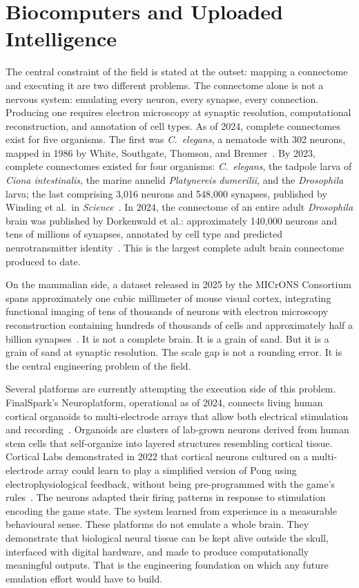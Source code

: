 \documentclass[12pt, a4paper]{article}
\begin{document}
\section{Biocomputers and Uploaded Intelligence}

The central constraint of the field is stated at the outset: mapping a connectome and executing it
are two different problems. The connectome alone is not a nervous system: emulating every neuron,
every synapse, every connection. Producing one requires electron microscopy at synaptic resolution,
computational reconstruction, and annotation of cell types. As of 2024, complete connectomes exist
for five organisms. The first was \textit{C.\ elegans}, a nematode with 302 neurons, mapped in 1986
by White, Southgate, Thomson, and Brenner~\cite{Bio-1}. By 2023, complete connectomes existed for
four organisms: \textit{C.\ elegans}, the tadpole larva of \textit{Ciona intestinalis}, the marine
annelid \textit{Platynereis dumerilii}, and the \textit{Drosophila} larva; the last comprising 3,016
neurons and 548,000 synapses, published by Winding et al.\ in \textit{Science}~\cite{Bio-2}. In
2024, the connectome of an entire adult \textit{Drosophila} brain was published by Dorkenwald et al.:
approximately 140,000 neurons and tens of millions of synapses, annotated by cell type and predicted
neurotransmitter identity~\cite{Bio-3}. This is the largest complete adult brain connectome produced
to date.

On the mammalian side, a dataset released in 2025 by the MICrONS Consortium spans approximately one
cubic millimeter of mouse visual cortex, integrating functional imaging of tens of thousands of
neurons with electron microscopy reconstruction containing hundreds of thousands of cells and
approximately half a billion synapses~\cite{Bio-4}. It is not a complete brain. It is a grain of
sand. But it is a grain of sand at synaptic resolution. The scale gap is not a rounding error. It is
the central engineering problem of the field.

Several platforms are currently attempting the execution side of this problem. FinalSpark's
Neuroplatform, operational as of 2024, connects living human cortical organoids to multi-electrode
arrays that allow both electrical stimulation and recording~\cite{Bio-5}. Organoids are clusters of
lab-grown neurons derived from human stem cells that self-organize into layered structures resembling
cortical tissue. Cortical Labs demonstrated in 2022 that cortical neurons cultured on a
multi-electrode array could learn to play a simplified version of Pong using electrophysiological
feedback, without being pre-programmed with the game's rules~\cite{Bio-6}. The neurons adapted their
firing patterns in response to stimulation encoding the game state. The system learned from
experience in a measurable behavioural sense. These platforms do not emulate a whole brain. They
demonstrate that biological neural tissue can be kept alive outside the skull, interfaced with digital
hardware, and made to produce computationally meaningful outputs. That is the engineering foundation
on which any future emulation effort would have to build.
\end{document}
